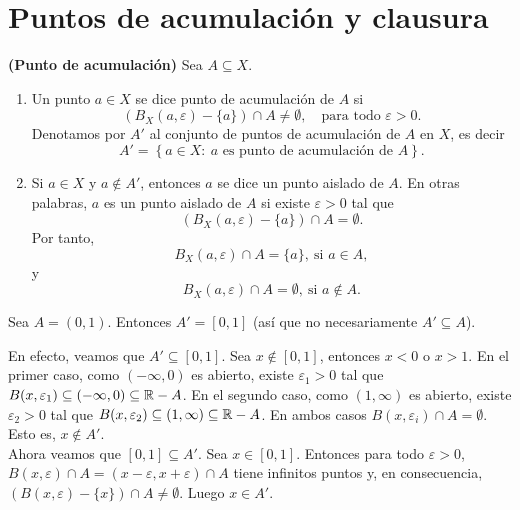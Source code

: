 \section{Puntos de acumulación y clausura}

\begin{definicion}\textbf{(Punto de acumulación)}
Sea $A\subseteq X$.
\begin{enumerate}
    \item Un punto $a\in X$ se dice punto de acumulación de $A$ si
    \[
    \left(B_X(a,\varepsilon)-\{a\}\right)\cap A\neq \emptyset,
    \quad \text{para todo } \varepsilon>0.
    \]
    Denotamos por $A'$ al conjunto de puntos de acumulación de $A$ en $X$, es decir
    \[
    A'=\left\{a\in X:\ \text{$a$ es punto de acumulación de $A$}\right\}.
    \]
    \item Si $a\in X$ y $a\notin A'$, entonces $a$ se dice un punto aislado de $A$. En otras palabras, $a$ es un punto aislado de $A$ si existe $\varepsilon>0$ tal que
    \[
    \left(B_X(a,\varepsilon)-\{a\}\right)\cap A=\emptyset.
    \]
    Por tanto,
    \[
    B_X(a,\varepsilon)\cap A=\{a\},\ \text{si } a\in A,
    \]
    y
    \[
    B_X(a,\varepsilon)\cap A=\emptyset,\ \text{si } a\notin A.
    \]
\end{enumerate}
\end{definicion}

\begin{example}
Sea $A=(0,1)$. Entonces $A'=[0,1]$ (así que no necesariamente $A'\subseteq A$).
\end{example}
En efecto, veamos que $A'\subseteq [0,1]$. Sea $x\notin [0,1]$, entonces $x<0$ o $x>1$. En el primer caso, como $(-\infty,0)$ es abierto, existe $\varepsilon_1>0$ tal que $B(x,\varepsilon_1)\subseteq (-\infty,0)\subseteq \mathbb{R}-A$. En el segundo caso, como $(1,\infty)$ es abierto, existe $\varepsilon_2>0$ tal que $B(x,\varepsilon_2)\subseteq (1,\infty)\subseteq \mathbb{R}-A$. En ambos casos $B(x,\varepsilon_i)\cap A=\emptyset$. Esto es, $x\notin A'$. \\
Ahora veamos que $[0,1]\subseteq A'$. Sea $x\in[0,1]$. Entonces para todo $\varepsilon>0$, $B(x,\varepsilon)\cap A=(x-\varepsilon, x+\varepsilon)\cap A$ tiene infinitos puntos y, en consecuencia, $(B(x,\varepsilon)-\{x\})\cap A\neq \emptyset$. Luego $x\in A'$.

